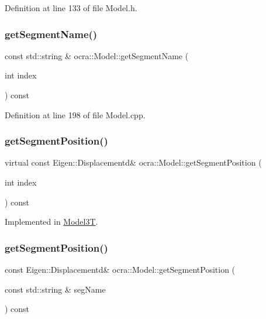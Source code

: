 Definition at line 133 of file Model.\+h.

\hypertarget{classocra_1_1Model_ac21f88edd570d8d012e8e20b7ddc20c4}{}\label{classocra_1_1Model_ac21f88edd570d8d012e8e20b7ddc20c4} 
\subsubsection{\texorpdfstring{get\+Segment\+Name()}{getSegmentName()}}
{\footnotesize\ttfamily const std\+::string \& ocra\+::\+Model\+::get\+Segment\+Name (\begin{DoxyParamCaption}\item[{int}]{index }\end{DoxyParamCaption}) const}



Definition at line 198 of file Model.\+cpp.

\hypertarget{classocra_1_1Model_ae7afe827a1c09b99d80134a447bd9ccc}{}\label{classocra_1_1Model_ae7afe827a1c09b99d80134a447bd9ccc} 
\subsubsection{\texorpdfstring{get\+Segment\+Position()}{getSegmentPosition()}\hspace{0.1cm}{\footnotesize\ttfamily [1/2]}}
{\footnotesize\ttfamily virtual const Eigen\+::\+Displacementd\& ocra\+::\+Model\+::get\+Segment\+Position (\begin{DoxyParamCaption}\item[{int}]{index }\end{DoxyParamCaption}) const\hspace{0.3cm}{\ttfamily [pure virtual]}}



Implemented in \hyperlink{classModel3T_af2408d3a32ae4762ce3c5951360f5f67}{Model3T}.

\hypertarget{classocra_1_1Model_a5206b4474952da51b30ff3cdc5b310c2}{}\label{classocra_1_1Model_a5206b4474952da51b30ff3cdc5b310c2} 
\subsubsection{\texorpdfstring{get\+Segment\+Position()}{getSegmentPosition()}\hspace{0.1cm}{\footnotesize\ttfamily [2/2]}}
{\footnotesize\ttfamily const Eigen\+::\+Displacementd\& ocra\+::\+Model\+::get\+Segment\+Position (\begin{DoxyParamCaption}\item[{const std\+::string \&}]{seg\+Name }\end{DoxyParamCaption}) const\hspace{0.3cm}{\ttfamily [inline]}}



